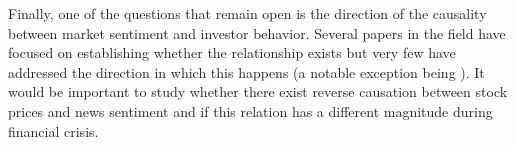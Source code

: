 \documentclass[a4paper, 12pt]{report}
\begin{document}
    Finally, one of the questions that remain open is the direction of the causality between market sentiment and investor behavior. Several papers in the field have focused on establishing whether the relationship exists but very few have addressed the direction in which this happens (a notable exception being \textcite{Garcia:2013}). It would be important to study whether there exist reverse causation between stock prices and news sentiment and if this relation has a different magnitude during financial crisis.
    
    
    
    
    
    
\end{document}
